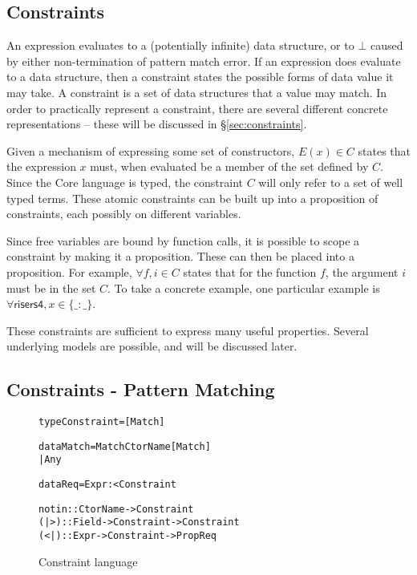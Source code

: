 \documentclass[preprint]{sigplanconf}
\newcommand{\C}[1]{\textsf{#1}}
\newenvironment{code}{\begin{alltt}\small}{\end{alltt}}
\newcommand{\g}[1]{\{#1\}} %
\begin{document}
\subsection{Constraints}

An expression evaluates to a (potentially infinite) data structure, or to $\bot{}$ caused by either non-termination of pattern match error. If an expression does evaluate to a data structure, then a constraint states the possible forms of data value it may take. A constraint is a set of data structures that a value may match. In order to practically represent a constraint, there are several different concrete representations -- these will be discussed in \S\ref{sec:constraints}.

Given a mechanism of expressing some set of constructors, $E(x) \in C$ states that the expression $x$ must, when evaluated be a member of the set defined by $C$. Since the Core language is typed, the constraint $C$ will only refer to a set of well typed terms. These atomic constraints can be built up into a proposition of constraints, each possibly on different variables.

Since free variables are bound by function calls, it is possible to scope a constraint by making it a proposition. These can then be placed into a proposition. For example, $\forall f, i \in C$ states that for the function $f$, the argument $i$ must be in the set $C$. To take a concrete example, one particular example is $\forall \C{risers4}, x \in \g{\_ : \_}$.

These constraints are sufficient to express many useful properties. Several underlying models are possible, and will be discussed later.

\subsection{Constraints - Pattern Matching}

\begin{figure}
\begin{code}
type Constraint = [Match]

data Match  =  Match CtorName [Match]
            |  Any

data Req = Expr :< Constraint

notin :: CtorName -> Constraint
(|>) :: Field -> Constraint -> Constraint
(<|) :: Expr -> Constraint -> Prop Req
\end{code}
\caption{Constraint language}
\label{fig:constraint}
\end{figure}
\end{document}
